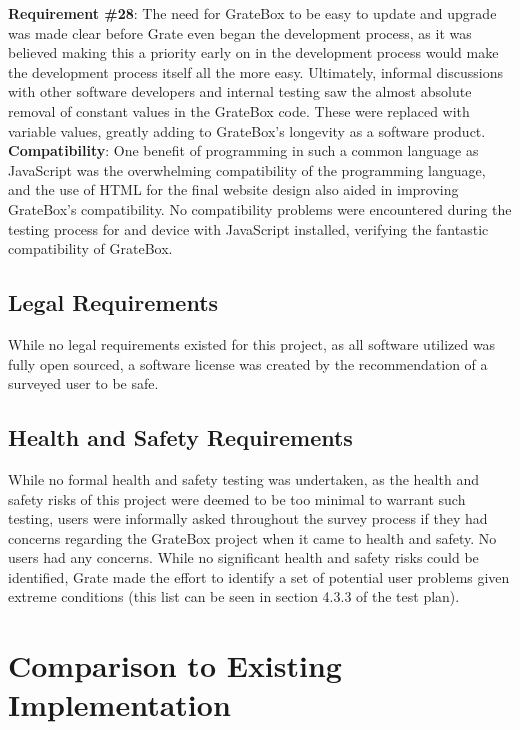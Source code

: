 \documentclass[12pt, titlepage]{article}
\begin{document}
\textbf{Requirement \#28}: The need for GrateBox to be easy to update and upgrade was made clear before Grate even began the development process, as it was believed making this a priority early on in the development process would make the development process itself all the more easy. Ultimately, informal discussions with other software developers and internal testing saw the almost absolute removal of constant values in the GrateBox code. These were replaced with variable values, greatly adding to GrateBox's longevity as a software product.\\

\textbf{Compatibility}: One benefit of programming in such a common language as JavaScript was the overwhelming compatibility of the programming language, and the use of HTML for the final website design also aided in improving GrateBox's compatibility. No compatibility problems were encountered during the testing process for and device with JavaScript installed, verifying the fantastic compatibility of GrateBox.

\subsection{Legal Requirements}

While no legal requirements existed for this project, as all software utilized was fully open sourced, a software license was created by the recommendation of a surveyed user to be safe.

\subsection{Health and Safety Requirements}

While no formal health and safety testing was undertaken, as the health and safety risks of this project were deemed to be too minimal to warrant such testing, users were informally asked throughout the survey process if they had concerns regarding the GrateBox project when it came to health and safety. No users had any concerns. While no significant health and safety risks could be identified, Grate made the effort to identify a set of potential user problems given extreme conditions (this list can be seen in section 4.3.3 of the test plan).

\section{Comparison to Existing Implementation}
\end{document}
